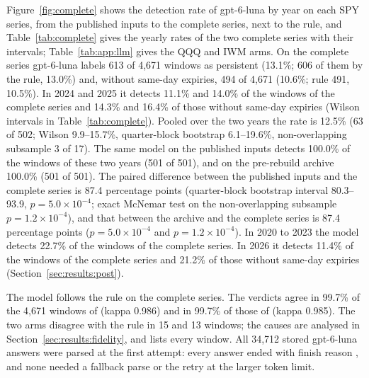 Figure~\ref{fig:complete} shows the detection rate of gpt-6-luna by year on each SPY series, from the published inputs to the complete series, next to the rule, and Table~\ref{tab:complete} gives the yearly rates of the two complete series with their intervals; Table~\ref{tab:app:llm} gives the QQQ and IWM arms.
On the complete series gpt-6-luna labels 613 of 4{,}671 windows as persistent (13.1\%; 606 of them by the rule, 13.0\%) and, without same-day expiries, 494 of 4{,}671 (10.6\%; rule 491, 10.5\%). In 2024 and 2025 it detects 11.1\% and 14.0\% of the windows of the complete series and 14.3\% and 16.4\% of those without same-day expiries (Wilson intervals in Table~\ref{tab:complete}). Pooled over the two years the rate is 12.5\% (63 of 502; Wilson 9.9--15.7\%, quarter-block bootstrap 6.1--19.6\%, non-overlapping subsample 3 of 17). The same model on the published inputs detects 100.0\% of the windows of these two years (501 of 501), and on the pre-rebuild archive 100.0\% (501 of 501). The paired difference between the published inputs and the complete series is 87.4 percentage points (quarter-block bootstrap interval 80.3--93.9, $p=5.0\times10^{-4}$; exact McNemar test on the non-overlapping subsample $p=1.2\times10^{-4}$), and that between the archive and the complete series is 87.4 percentage points ($p=5.0\times10^{-4}$ and $p=1.2\times10^{-4}$). In 2020 to 2023 the model detects 22.7\% of the windows of the complete series. In 2026 it detects 11.4\% of the windows of the complete series and 21.2\% of those without same-day expiries (Section~\ref{sec:results:post}).

The model follows the rule on the complete series. The verdicts agree in 99.7\% of the 4{,}671 windows of  (kappa 0.986) and in 99.7\% of those of  (kappa 0.985). The two arms disagree with the rule in 15 and 13 windows; the causes are analysed in Section~\ref{sec:results:fidelity}, and  lists every window. All 34{,}712 stored gpt-6-luna answers were parsed at the first attempt: every answer ended with finish reason , and none needed a fallback parse or the retry at the larger token limit.

